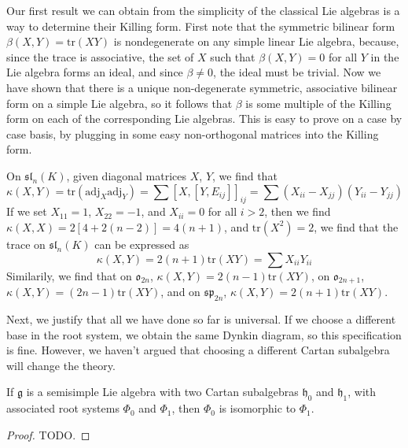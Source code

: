 Our first result we can obtain from the simplicity of the classical Lie algebras is a way to determine their Killing form. First note that the symmetric bilinear form $\beta(X,Y) = \text{tr}(XY)$ is nondegenerate on any simple linear Lie algebra, because, since the trace is associative, the set of $X$ such that $\beta(X,Y) = 0$ for all $Y$ in the Lie algebra forms an ideal, and since $\beta \neq 0$, the ideal must be trivial. Now we have shown that there is a unique non-degenerate symmetric, associative bilinear form on a simple Lie algebra, so it follows that $\beta$ is some multiple of the Killing form on each of the corresponding Lie algebras. This is easy to prove on a case by case basis, by plugging in some easy non-orthogonal matrices into the Killing form.

\begin{example}
    On $\mathfrak{sl}_n(K)$, given diagonal matrices $X$, $Y$, we find that
    \[ \kappa(X, Y) = \text{tr}(\text{adj}_X \text{adj}_Y) = \sum [X,[Y,E_{ij}]]_{ij} = \sum (X_{ii} - X_{jj})(Y_{ii} - Y_{jj}) \]
    If we set $X_{11} = 1$, $X_{22} = -1$, and $X_{ii} = 0$ for all $i > 2$, then we find $\kappa(X,X) = 2[4 + 2(n-2)] = 4(n+1)$, and $\text{tr}(X^2) = 2$, we find that the trace on $\mathfrak{sl}_n(K)$ can be expressed as
    \[ \kappa(X,Y) = 2(n+1) \text{tr}(XY) = \sum X_{ii} Y_{ii} \]
    Similarily, we find that on $\mathfrak{o}_{2n}$, $\kappa(X,Y) = 2(n-1) \text{tr}(XY)$, on $\mathfrak{o}_{2n+1}$, $\kappa(X,Y) = (2n - 1) \text{tr}(XY)$, and on $\mathfrak{sp}_{2n}$, $\kappa(X,Y) = 2(n+1) \text{tr}(XY)$.
\end{example}

Next, we justify that all we have done so far is universal. If we choose a different base in the root system, we obtain the same Dynkin diagram, so this specification is fine. However, we haven't argued that choosing a different Cartan subalgebra will change the theory.

\begin{theorem}
    If $\mathfrak{g}$ is a semisimple Lie algebra with two Cartan subalgebras $\mathfrak{h}_0$ and $\mathfrak{h}_1$, with associated root systems $\Phi_0$ and $\Phi_1$, then $\Phi_0$ is isomorphic to $\Phi_1$.
\end{theorem}
\begin{proof}
    TODO.
\end{proof}

